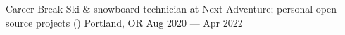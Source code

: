 \showoff
{Career Break}
{Ski \& snowboard technician at Next Adventure; personal open-source projects ()}
{Portland, OR}
{Aug 2020 --- Apr 2022}
\par
